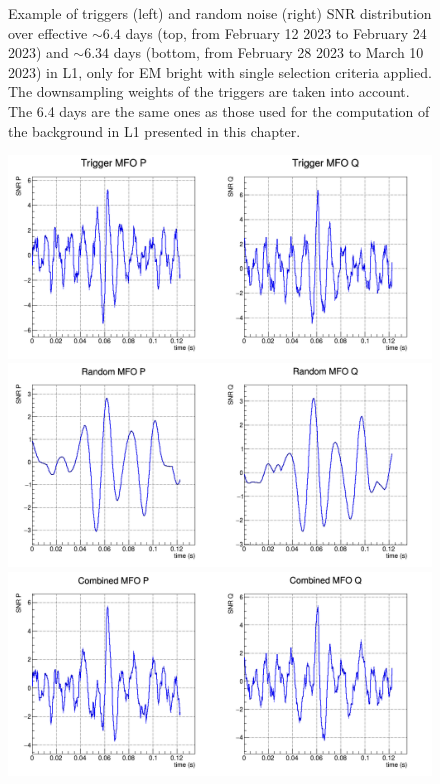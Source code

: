 \begin{figure}[ht]
\begin{minipage}{0.45\linewidth}
  \end{minipage}
  \hfill
  \caption{Example of triggers (left) and random noise (right) SNR distribution over effective $\sim 6.4$ days (top, from February 12 2023 to February 24 2023) and $\sim 6.34$ days (bottom, from February 28 2023 to March 10 2023) in L1, only for EM bright with single selection criteria applied.
    The downsampling weights of the triggers are taken into account.
    The 6.4 days are the same ones as those used for the computation of the background in L1 presented in this chapter.}
  \label{fig:single_band_good}
\end{figure}







\begin{figure}[ht]
    \centering
    \begin{minipage}{\linewidth}
        \centering
        \includegraphics[width=0.8\linewidth]{sectionFAR/O4/cTrigMFO.png}
    \end{minipage}
    \hfill
    \begin{minipage}{\linewidth}
        \centering
        \includegraphics[width=0.8\linewidth]{sectionFAR/O4/cRandMFO.png}
    \end{minipage}
    \hfill
    \vspace{5mm}
    \begin{minipage}{\linewidth}
        \centering
        \includegraphics[width=0.8\linewidth]{sectionFAR/O4/cCombiMFO.png}

\end{minipage}
\end{figure}
